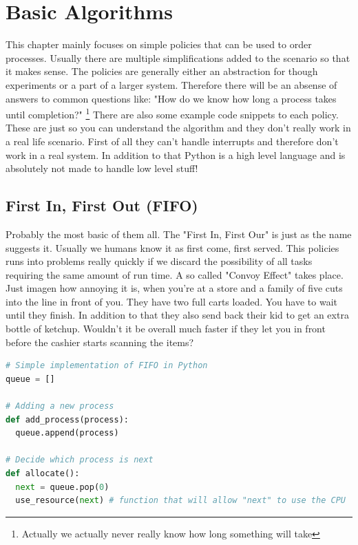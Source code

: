 \documentclass{report}
\begin{document}

\chapter{Basic Algorithms}

This chapter mainly focuses on simple policies that can be used to order processes.
Usually there are multiple simplifications added to the scenario so that it makes sense.
The policies are generally either an abstraction for though experiments or a part of a larger system.
Therefore there will be an absense of answers to common questions like: "How do we know how long a process takes until completion?" \footnote{Actually we actually never really know how long something will take}
There are also some example code snippets to each policy.
These are just so you can understand the algorithm and they don't really work in a real life scenario.
First of all they can't handle interrupts and therefore don't work in a real system.
In addition to that Python is a high level language and is absolutely not made to handle low level stuff!

\section{First In, First Out (FIFO)}

Probably the most basic of them all.
The "First In, First Our" is just as the name suggests it. 
Usually we humans know it as first come, first served. 
This policies runs into problems really quickly if we discard the possibility of all tasks requiring the same amount of run time. 
A so called "Convoy Effect" takes place. 
Just imagen how annoying it is, when you're at a store and a family of five cuts into the line in front of you. 
They have two full carts loaded. You have to wait until they finish. 
In addition to that they also send back their kid to get an extra bottle of ketchup. 
Wouldn't it be overall much faster if they let you in front before the cashier starts scanning the items?

\begin{lstlisting}[language=Python, style=colorEX, label=cd:fifo-python]
# Simple implementation of FIFO in Python
queue = []

# Adding a new process
def add_process(process):
  queue.append(process)

# Decide which process is next
def allocate():
  next = queue.pop(0)
  use_resource(next) # function that will allow "next" to use the CPU
\end{lstlisting}
\end{document}
